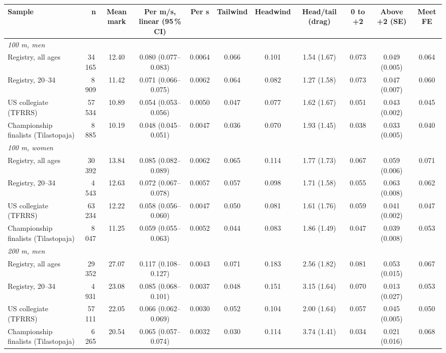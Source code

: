 \begin{tabular}{lrccccccccc}
\toprule
Sample & n & Mean mark & Per m/s, linear (95\,\% CI) & Per s & Tailwind & Headwind & Head/tail (drag) & 0 to +2 & Above +2 (SE) & Meet FE \\
\midrule
\multicolumn{11}{l}{\textit{100 m, men}} \\
Registry, all ages & 34\,165 & 12.40 & 0.080 (0.077--0.083) & 0.0064 & 0.066 & 0.101 & 1.54 (1.67) & 0.073 & 0.049 (0.005) & 0.064 \\
Registry, 20--34 & 8\,909 & 11.42 & 0.071 (0.066--0.075) & 0.0062 & 0.064 & 0.082 & 1.27 (1.58) & 0.073 & 0.047 (0.007) & 0.060 \\
US collegiate (TFRRS) & 57\,534 & 10.89 & 0.054 (0.053--0.056) & 0.0050 & 0.047 & 0.077 & 1.62 (1.67) & 0.051 & 0.043 (0.002) & 0.045 \\
Championship finalists (Tilastopaja) & 8\,885 & 10.19 & 0.048 (0.045--0.051) & 0.0047 & 0.036 & 0.070 & 1.93 (1.45) & 0.038 & 0.033 (0.005) & 0.040 \\
\multicolumn{11}{l}{\textit{100 m, women}} \\
Registry, all ages & 30\,392 & 13.84 & 0.085 (0.082--0.089) & 0.0062 & 0.065 & 0.114 & 1.77 (1.73) & 0.067 & 0.059 (0.006) & 0.071 \\
Registry, 20--34 & 4\,543 & 12.63 & 0.072 (0.067--0.078) & 0.0057 & 0.057 & 0.098 & 1.71 (1.58) & 0.055 & 0.063 (0.008) & 0.062 \\
US collegiate (TFRRS) & 63\,234 & 12.22 & 0.058 (0.056--0.060) & 0.0047 & 0.050 & 0.081 & 1.61 (1.76) & 0.059 & 0.041 (0.002) & 0.047 \\
Championship finalists (Tilastopaja) & 8\,047 & 11.25 & 0.059 (0.055--0.063) & 0.0052 & 0.044 & 0.083 & 1.86 (1.49) & 0.047 & 0.039 (0.008) & 0.053 \\
\multicolumn{11}{l}{\textit{200 m, men}} \\
Registry, all ages & 29\,352 & 27.07 & 0.117 (0.108--0.127) & 0.0043 & 0.071 & 0.183 & 2.56 (1.82) & 0.081 & 0.053 (0.015) & 0.067 \\
Registry, 20--34 & 4\,931 & 23.08 & 0.085 (0.068--0.101) & 0.0037 & 0.048 & 0.151 & 3.15 (1.64) & 0.070 & 0.013 (0.027) & 0.053 \\
US collegiate (TFRRS) & 57\,111 & 22.05 & 0.066 (0.062--0.069) & 0.0030 & 0.052 & 0.104 & 2.00 (1.64) & 0.057 & 0.045 (0.005) & 0.050 \\
Championship finalists (Tilastopaja) & 6\,265 & 20.54 & 0.065 (0.057--0.074) & 0.0032 & 0.030 & 0.114 & 3.74 (1.41) & 0.034 & 0.021 (0.016) & 0.068 \\

\end{tabular}
